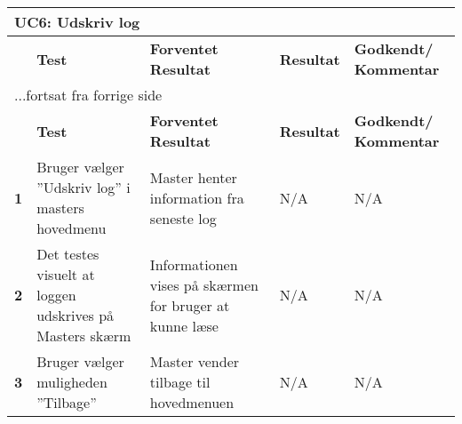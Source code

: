
\begin{center}
\begin{longtable}{|p{}|p{}|p{}|p{}|p{}|} %
\hline
\multicolumn{5}{|l|}{\textbf{UC6: Udskriv log}} \\ \hline
\multicolumn{1}{|c|}{} &
\textbf{Test} &
\textbf{Forventet \newline Resultat} &
\textbf{Resultat} &
\textbf{Godkendt/ \newline Kommentar} \\ \hline 
\endfirsthead

\multicolumn{5}{l}{...fortsat fra forrige side} \\ \hline 
\multicolumn{1}{|c|}{} &
\textbf{Test} &
\textbf{Forventet \newline Resultat} &
\textbf{Resultat} &
\textbf{Godkendt/ \newline Kommentar} \\ \hline 
\endhead

\textbf{1}	&Bruger vælger ''Udskriv log'' i masters hovedmenu
			&Master henter information fra seneste log
			&N/A
			&N/A \\ \hline 
			
\textbf{2}	&Det testes visuelt at loggen udskrives på Masters skærm
			&Informationen vises på skærmen for bruger at kunne læse
			&N/A
			&N/A \\ \hline 
			
\textbf{3}	&Bruger vælger muligheden ''Tilbage''
			&Master vender tilbage til hovedmenuen
			&N/A
			&N/A \\ \hline 
			
\end{longtable}
	\label{ATUC8} 
\end{center}
